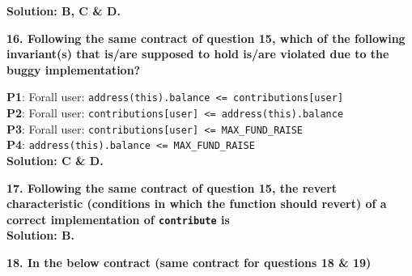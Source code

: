 \textbf{Solution: B, C \& D.}

\textbf{16. Following the same contract of question 15, which of the following invariant(s) that is/are supposed to hold is/are violated due to the buggy implementation?}

\textbf{P1}: Forall user: \verb|address(this).balance <= contributions[user]|\\
\textbf{P2}: Forall user: \verb|contributions[user] <= address(this).balance|\\
\textbf{P3}: Forall user: \verb|contributions[user] <= MAX_FUND_RAISE|\\
\textbf{P4}: \verb|address(this).balance <= MAX_FUND_RAISE|\label{sec:raceXcertora_q16}\\

\textbf{Solution: C \& D.}

\pagebreak

\textbf{17. Following the same contract of question 15, the revert characteristic (conditions in which the function should revert) of a correct implementation of \texttt{contribute} is}\label{sec:raceXcertora_q17}\\

\textbf{Solution: B.}

\textbf{18. In the below contract (same contract for questions 18 \& 19)}


